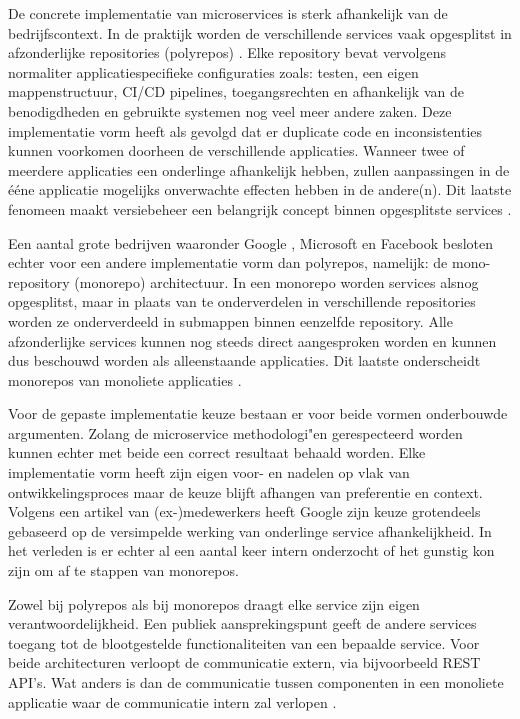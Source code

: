 \documentclass{hogent-article}
\begin{document}
De concrete implementatie van microservices is sterk afhankelijk van de bedrijfscontext. In de praktijk worden de verschillende services vaak opgesplitst in afzonderlijke repositories (polyrepos) \autocite{Brousse2019}. Elke repository bevat vervolgens normaliter applicatiespecifieke configuraties zoals: testen, een eigen mappenstructuur, CI/CD pipelines, toegangsrechten en afhankelijk van de benodigdheden en gebruikte systemen nog veel meer andere zaken. Deze implementatie vorm heeft als gevolgd dat er duplicate code en inconsistenties kunnen voorkomen doorheen de verschillende applicaties. Wanneer twee of meerdere applicaties een onderlinge afhankelijk hebben, zullen aanpassingen in de \'e\'ene applicatie mogelijks onverwachte effecten hebben in de andere(n). Dit laatste fenomeen maakt versiebeheer een belangrijk concept binnen opgesplitste services \autocite{Richardson2019}.

Een aantal grote bedrijven waaronder Google \autocite{Potvin&Levenberg2016}, Microsoft \autocite{Tirion2021} en Facebook \autocite{Goode2014} besloten echter voor een andere implementatie vorm dan polyrepos, namelijk: de mono-repository (monorepo) architectuur.
In een monorepo worden services alsnog opgesplitst, maar in plaats van te onderverdelen in verschillende repositories worden ze onderverdeeld in submappen binnen eenzelfde repository.
Alle afzonderlijke services kunnen nog steeds direct aangesproken worden en kunnen dus beschouwd worden als alleenstaande applicaties.
Dit laatste onderscheidt monorepos van monoliete applicaties \autocite{Brito2018}.

Voor de gepaste implementatie keuze bestaan er voor beide vormen onderbouwde argumenten. Zolang de microservice methodologi"en gerespecteerd worden kunnen echter met beide een correct resultaat behaald worden. Elke implementatie vorm heeft zijn eigen voor- en nadelen op vlak van ontwikkelingsproces maar de keuze blijft afhangen van preferentie en context. Volgens een artikel van (ex-)medewerkers \textcite{Potvin&Levenberg2016} heeft Google zijn keuze grotendeels gebaseerd op de versimpelde werking van onderlinge service afhankelijkheid. In het verleden is er echter al een aantal keer intern onderzocht of het gunstig kon zijn om af te stappen van monorepos.  

Zowel bij polyrepos als bij monorepos draagt elke service zijn eigen verantwoordelijkheid. Een publiek aansprekingspunt geeft de andere services toegang tot de blootgestelde functionaliteiten van een bepaalde service. Voor beide architecturen verloopt de communicatie extern, via bijvoorbeeld REST API's. Wat anders is dan de communicatie tussen componenten in een monoliete applicatie waar de communicatie intern zal verlopen \autocite{Richardson2019}.
\end{document}
